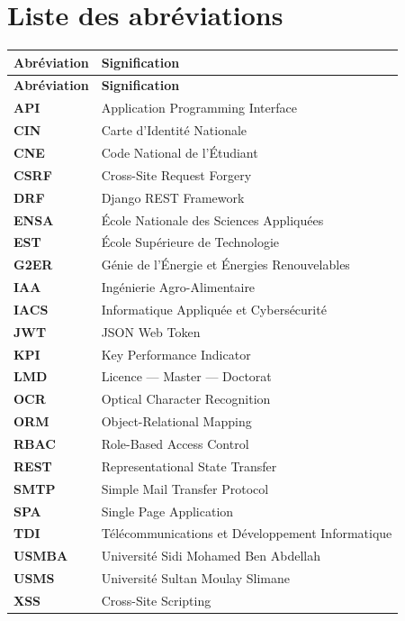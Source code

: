 \chapter*{Liste des abréviations}

\begin{longtable}{@{} >{\bfseries}l @{\hspace{1.5cm}} p{10cm} @{}}
\toprule
\textbf{Abréviation} & \textbf{Signification} \\
\midrule
\endfirsthead
\toprule
\textbf{Abréviation} & \textbf{Signification} \\
\midrule
\endhead
\bottomrule
\endlastfoot
API   & Application Programming Interface \\
CIN   & Carte d'Identité Nationale \\
CNE   & Code National de l'Étudiant \\
CSRF  & Cross-Site Request Forgery \\
DRF   & Django REST Framework \\
ENSA  & École Nationale des Sciences Appliquées \\
EST   & École Supérieure de Technologie \\
G2ER  & Génie de l'Énergie et Énergies Renouvelables \\
IAA   & Ingénierie Agro-Alimentaire \\
IACS  & Informatique Appliquée et Cybersécurité \\
JWT   & JSON Web Token \\
KPI   & Key Performance Indicator \\
LMD   & Licence --- Master --- Doctorat \\
OCR   & Optical Character Recognition \\
ORM   & Object-Relational Mapping \\
RBAC  & Role-Based Access Control \\
REST  & Representational State Transfer \\
SMTP  & Simple Mail Transfer Protocol \\
SPA   & Single Page Application \\
TDI   & Télécommunications et Développement Informatique \\
USMBA & Université Sidi Mohamed Ben Abdellah \\
USMS  & Université Sultan Moulay Slimane \\
XSS   & Cross-Site Scripting \\
\bottomrule
\end{longtable}

